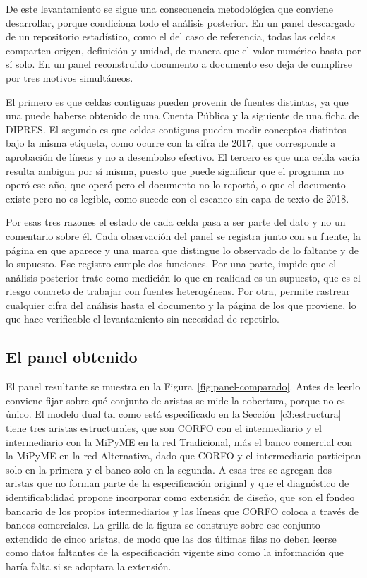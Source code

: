 De este levantamiento se sigue una consecuencia metodológica que conviene desarrollar, porque condiciona todo el análisis posterior. En un panel descargado de un repositorio estadístico, como el del caso de referencia, todas las celdas comparten origen, definición y unidad, de manera que el valor numérico basta por sí solo. En un panel reconstruido documento a documento eso deja de cumplirse por tres motivos simultáneos.

El primero es que celdas contiguas pueden provenir de fuentes distintas, ya que una puede haberse obtenido de una Cuenta Pública y la siguiente de una ficha de DIPRES. El segundo es que celdas contiguas pueden medir conceptos distintos bajo la misma etiqueta, como ocurre con la cifra de 2017, que corresponde a aprobación de líneas y no a desembolso efectivo. El tercero es que una celda vacía resulta ambigua por sí misma, puesto que puede significar que el programa no operó ese año, que operó pero el documento no lo reportó, o que el documento existe pero no es legible, como sucede con el escaneo sin capa de texto de 2018.

Por esas tres razones el estado de cada celda pasa a ser parte del dato y no un comentario sobre él. Cada observación del panel se registra junto con su fuente, la página en que aparece y una marca que distingue lo observado de lo faltante y de lo supuesto. Ese registro cumple dos funciones. Por una parte, impide que el análisis posterior trate como medición lo que en realidad es un supuesto, que es el riesgo concreto de trabajar con fuentes heterogéneas. Por otra, permite rastrear cualquier cifra del análisis hasta el documento y la página de los que proviene, lo que hace verificable el levantamiento sin necesidad de repetirlo.

\subsection{El panel obtenido}
\label{c4:levantamiento-panel}

El panel resultante se muestra en la Figura~\ref{fig:panel-comparado}. Antes de leerlo conviene fijar sobre qué conjunto de aristas se mide la cobertura, porque no es único. El modelo dual tal como está especificado en la Sección~\ref{c3:estructura} tiene tres aristas estructurales, que son CORFO con el intermediario y el intermediario con la MiPyME en la red Tradicional, más el
banco comercial con la MiPyME en la red Alternativa, dado que CORFO y el intermediario participan solo en la primera y el banco solo en la segunda. A esas tres se agregan dos aristas que no forman parte de la especificación original y que el diagnóstico de identificabilidad propone incorporar como extensión de diseño, que son el fondeo bancario de los propios intermediarios y las líneas que CORFO coloca a través de bancos comerciales. La grilla de la figura se construye sobre ese conjunto extendido de cinco aristas, de modo que las dos últimas filas no deben leerse como datos faltantes de la especificación vigente sino como la información que haría falta si se adoptara la extensión.

